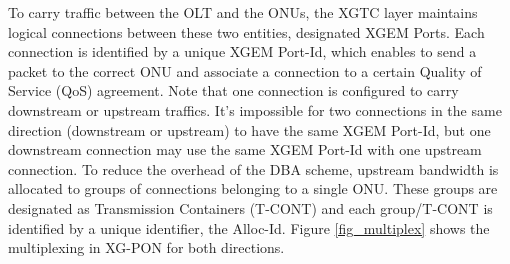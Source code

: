 To carry traffic between the OLT and the ONUs, the XGTC layer
maintains logical connections between these two entities,
designated XGEM Ports. Each connection is identified by a unique
XGEM Port-Id, which enables to send a packet to the correct ONU
and associate a connection to a certain Quality of Service (QoS)
agreement. Note that one connection is configured to carry
downstream or upstream traffics. It's impossible for two
connections in the same direction (downstream or upstream) to have
the same XGEM Port-Id, but one downstream connection may use the
same XGEM Port-Id with one upstream connection. To reduce the
overhead of the DBA scheme, upstream bandwidth is allocated to
groups of connections belonging to a single ONU. These groups are
designated as Transmission Containers (T-CONT) and each
group/T-CONT is identified by a unique identifier, the Alloc-Id.
Figure \ref{fig_multiplex} shows the multiplexing in XG-PON for
both directions.


